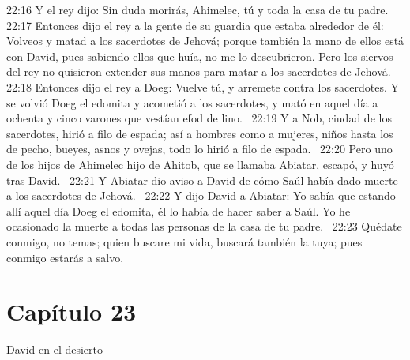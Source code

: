 22:16 Y el rey dijo: Sin duda morirás, Ahimelec, tú y toda la casa de tu padre.  
22:17 Entonces dijo el rey a la gente de su guardia que estaba alrededor de él: Volveos y matad a los sacerdotes de Jehová; porque también la mano de ellos está con David, pues sabiendo ellos que huía, no me lo descubrieron. Pero los siervos del rey no quisieron extender sus manos para matar a los sacerdotes de Jehová.  
22:18 Entonces dijo el rey a Doeg: Vuelve tú, y arremete contra los sacerdotes. Y se volvió Doeg el edomita y acometió a los sacerdotes, y mató en aquel día a ochenta y cinco varones que vestían efod de lino.  
22:19 Y a Nob, ciudad de los sacerdotes, hirió a filo de espada; así a hombres como a mujeres, niños hasta los de pecho, bueyes, asnos y ovejas, todo lo hirió a filo de espada.  
22:20 Pero uno de los hijos de Ahimelec hijo de Ahitob, que se llamaba Abiatar, escapó, y huyó tras David.  
22:21 Y Abiatar dio aviso a David de cómo Saúl había dado muerte a los sacerdotes de Jehová.  
22:22 Y dijo David a Abiatar: Yo sabía que estando allí aquel día Doeg el edomita, él lo había de hacer saber a Saúl. Yo he ocasionado la muerte a todas las personas de la casa de tu padre.  
22:23 Quédate conmigo, no temas; quien buscare mi vida, buscará también la tuya; pues conmigo estarás a salvo.  
\section*{Capítulo 23}
David en el desierto  

